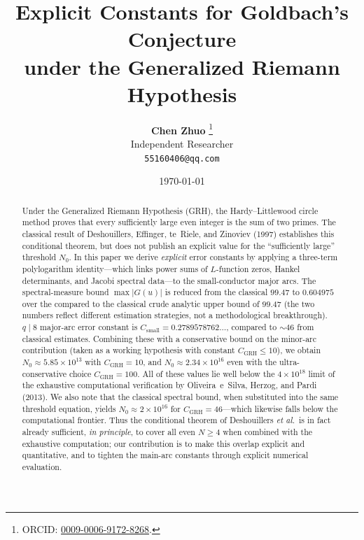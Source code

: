 \documentclass[11pt,a4paper]{article}
\theoremstyle{plain}
\theoremstyle{definition}
\theoremstyle{remark}
\numberwithin{equation}{section}
\numberwithin{table}{section}
\begin{document}

\title{\textbf{Explicit Constants for Goldbach's Conjecture\\
under the Generalized Riemann Hypothesis}}

\author{
  \textbf{Chen Zhuo}%
  \thanks{ORCID: \href{https://orcid.org/0009-0006-9172-8268}{0009-0006-9172-8268}.}\\[4pt]
  Independent Researcher\\[2pt]
  \texttt{55160406@qq.com}
}

\date{\today}

\maketitle

\begin{abstract}
Under the Generalized Riemann Hypothesis (GRH), the Hardy--Littlewood circle
method proves that every sufficiently large even integer is the sum of two
primes.  The classical result of Deshouillers, Effinger, te~Riele, and
Zinoviev (1997) establishes this conditional theorem, but does not publish
an explicit value for the ``sufficiently large'' threshold $N_0$.
In this paper we derive \emph{explicit} error constants by
applying a three-term polylogarithm identity---which links power sums of
$L$-function zeros, Hankel determinants, and Jacobi spectral data---to the
small-conductor major arcs.  The spectral-measure bound
$\max|G(u)|$ is reduced from the classical $99.47$ to $0.604975$ over the
compared to the classical crude analytic upper bound
of $99.47$ (the two numbers reflect different estimation strategies, not a methodological breakthrough).
$q\mid 8$ major-arc error constant is
$C_{\mathrm{small}}=0.2789578762\ldots$, compared to $\sim 46$ from
classical estimates.  Combining these with a conservative bound on the
minor-arc contribution (taken as a working hypothesis with constant
$C_{\mathrm{GRH}}\le 10$), we obtain $N_0 \approx 5.85\times 10^{13}$ with
$C_{\mathrm{GRH}}=10$, and $N_0\approx 2.34\times 10^{16}$ even with the
ultra-conservative choice $C_{\mathrm{GRH}}=100$.  All of these values lie
well below the $4\times 10^{18}$ limit of the exhaustive computational
verification by Oliveira~e~Silva, Herzog, and Pardi (2013).  We also note
that the classical spectral bound, when substituted into the same
threshold equation, yields $N_0\approx 2\times 10^{16}$ for
$C_{\mathrm{GRH}}=46$---which likewise falls below the computational
frontier.  Thus the conditional theorem of Deshouillers \emph{et al.}\ is
in fact already sufficient, \emph{in principle}, to cover all even $N\ge 4$
when combined with the exhaustive computation; our contribution is to make
this overlap explicit and quantitative, and to tighten the main-arc
constants through explicit numerical evaluation.
\end{abstract}
\end{document}
